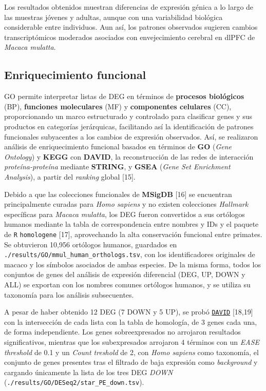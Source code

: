 \documentclass[
  12pt,
  letterpaper,
  DIV=11,
  numbers=noendperiod]{scrartcl}
\begin{document}
Los resultados obtenidos muestran diferencias de expresión génica a lo
largo de las muestras jóvenes y adultas, aunque con una variabilidad
biológica considerable entre individuos. Aun así, los patrones
observados sugieren cambios transcriptómicos moderados asociados con
envejecimiento cerebral en dlPFC de \emph{Macaca mulatta}.

\subsection{Enriquecimiento funcional}\label{enriquecimiento-funcional}

GO permite interpretar listas de DEG en términos de \textbf{procesos
biológicos} (BP), \textbf{funciones moleculares} (MF) y
\textbf{componentes celulares} (CC), proporcionando un marco
estructurado y controlado para clasificar genes y sus productos en
categorías jerárquicas, facilitando así la identificación de patrones
funcionales subyacentes a los cambios de expresión observados. Así, se
realizaron análisis de enriquecimiento funcional basados en términos de
\textbf{GO} (\emph{Gene Ontology}) y \textbf{KEGG} con \textbf{DAVID},
la reconstrucción de las redes de interacción \emph{proteína-proteína}
mediante \textbf{STRING}, y \textbf{GSEA} (\emph{Gene Set Enrichment
Analysis}), a partir del \emph{ranking} global {[}15{]}.

Debido a que las colecciones funcionales de \textbf{MSigDB} {[}16{]} se
encuentran principalmente curadas para \emph{Homo sapiens} y no existen
colecciones \emph{Hallmark} específicas para \emph{Macaca mulatta}, los
DEG fueron convertidos a sus ortólogos humanos mediante la tabla de
correspondencia entre nombres y IDs y el paquete de \texttt{R}
\texttt{homologene} {[}17{]}, aprovechando la alta conservación
funcional entre primates. Se obtuvieron 10,956 ortólogos humanos,
guardados en \texttt{./results/GO/mmul\_human\_orthologs.tsv}, con los
identificadores originales de macaco y los símbolos asociados de ambas
especies. De la misma forma, todos los conjuntos de genes del análisis
de expresión diferencial (DEG, UP, DOWN y ALL) se exportan con los
nombres comunes ortólogos humanos, y se utiliza su taxonomía para los
análisis subsecuentes.

A pesar de haber obtenido 12 DEG (7 DOWN y 5 UP), se probó
\href{https://davidbioinformatics.nih.gov/workspace.html}{\texttt{DAVID}}
{[}18,19{]} con la intersección de cada lista con la tabla de homología,
de 3 genes cada una, de forma independiente. Los genes sobreexpresados
no arrojaron resultados significativos, mientras que los subexpresados
arrojaron 4 términos con un \emph{EASE threshold} de 0.1 y un
\emph{Count treshold} de 2, con \emph{Homo sapiens} como taxonomía, el
conjunto de genes presentes tras el filtrado de baja expresión como
\emph{background} y cargando únicamente la lista de los tres DEG
\emph{DOWN} (\texttt{./results/GO/DESeq2/star\_PE\_down.tsv}).
\end{document}
